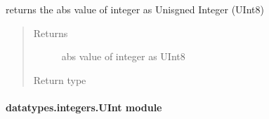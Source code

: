 \documentclass[letterpaper,10pt,english]{sphinxmanual}
\begin{document}
\begin{fulllineitems}
\begin{fulllineitems}
\label{datatypes.integers:datatypes.integers.Int8.Int8.toUInt8}
returns the abs value of integer as Unisgned Integer (UInt8)
\begin{quote}\begin{description}
\item[{Returns}] \leavevmode
abs value of integer as UInt8

\item[{Return type}] \leavevmode
{\hyperref[datatypes.integers:datatypes.integers.UInt8.UInt8]{}}

\end{description}\end{quote}

\end{fulllineitems}


\end{fulllineitems}



\paragraph{datatypes.integers.UInt module}
\label{datatypes.integers:datatypes-integers-uint-module}\label{datatypes.integers:module-datatypes.integers.UInt}
\end{document}
